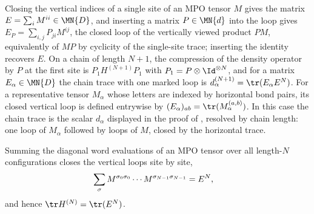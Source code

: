\begin{definition}
    \label{def:mpdo_vertical_loops}
    \leanok
    Closing the vertical indices of a single site of an MPO tensor $M$ gives
    the matrix $E=\sum_i M^{ii}\in\MN{D}$, and inserting a matrix
    $P\in\MN{d}$ into the loop gives
    $E_P=\sum_{i,j}P_{ji}M^{ij}$, the closed loop of the vertically viewed
    product $PM$, equivalently of $MP$ by cyclicity of the single-site
    trace; inserting the identity recovers $E$. On a chain of length $N+1$,
    the compression of the density
    operator by $P$ at the first site is $P_1H^{(N+1)}P_1$ with
    $P_1=P\otimes\Id^{\otimes N}$, and for a matrix
    $E_\alpha\in\MN{D}$ the chain trace with one marked loop is
    $d_\alpha^{(N+1)}=\tr(E_\alpha E^N)$.
    For a representative tensor $M_\alpha$ whose letters are indexed by
    horizontal bond pairs, its closed vertical loop is defined entrywise by
    $(E_\alpha)_{ab}=\tr(M_\alpha^{(a,b)})$.
    In this case the chain trace is the scalar $d_\alpha$ displayed in the
    proof of \cite[Proposition~4.13]{Cirac2016MPDO_arXiv}, resolved by chain
    length: one loop of $M_\alpha$ followed by loops of $M$, closed by the
    horizontal trace.
\end{definition}

\begin{lemma}
    \label{lem:mpdo_trace_loop_chain}
    \leanok
    Summing the diagonal word evaluations of an MPO tensor over all
    length-$N$ configurations closes the vertical loops site by site,
    \begin{align}
        \sum_{\sigma}
        M^{\sigma_0\sigma_0}\cdots M^{\sigma_{N-1}\sigma_{N-1}}
         & =E^N,
        \notag
    \end{align}
    and hence $\tr H^{(N)}=\tr(E^N)$.
\end{lemma}

